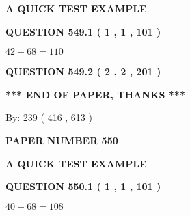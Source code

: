 \documentclass[12pt]{article}
\begin{document}
   
   
   
   
   
 \vspace{0.2in}
{\LARGE {\textbf{ A QUICK TEST EXAMPLE}}}
   
   
  
\vspace{0.2in}
  
{\textbf{\Large{QUESTION
549.1 
 ( 1 , 1 , 101 )
}}}
  
  
 
 

$ %
42 +  %
68=   %
110$
 
 
  
\vspace{0.2in}
  
{\textbf{\Large{QUESTION
549.2 
 ( 2 , 2 , 201 )
}}}
  
  
   
   
 \vspace{0.2in}
 
   
   
   
   
\vspace{1.0in} 
{\textbf{\large{ *** END OF PAPER, THANKS *** }}} 
   
   
\hspace{1.0in} By: 
 239 ( 416 ,  613 )
   
   
   
   
\newpage 
\setcounter{page}{ 
   550001 } 
   
   
   
   
 {\textbf{ \Large{ PAPER NUMBER  550  }}}
   
   
\vspace{0.2in}
   
   
   
   
   
   
 \vspace{0.2in}
{\LARGE {\textbf{ A QUICK TEST EXAMPLE}}}
   
   
  
\vspace{0.2in}
  
{\textbf{\Large{QUESTION
550.1 
 ( 1 , 1 , 101 )
}}}
  
  
 
 

$ %
40 +  %
68=   %
108$
 
\end{document}
